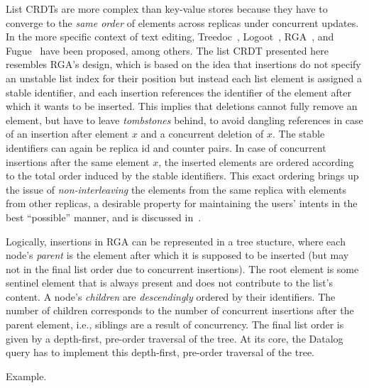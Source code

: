 List \acp{CRDT} are more complex than key-value stores because they have to
converge to the \emph{same order} of elements across replicas under concurrent
updates.
In the more specific context of text editing, Treedoc~\cite{treedoc},
Logoot~\cite{logoot}, RGA~\cite{rga}, and Fugue~\cite{fugue} have been proposed,
among others.
The list \ac{CRDT} presented here resembles RGA's design,
which is based on the idea that insertions do not specify an unstable list index
for their position but instead each list element is assigned a stable identifier,
and each insertion references the identifier of the element after which it wants
to be inserted.
This implies that deletions cannot fully remove an element, but have to leave
\emph{tombstones} behind, to avoid dangling references in case of an
insertion after element \(x\) and a concurrent deletion of \(x\).
The stable identifiers can again be replica id and counter pairs.
In case of concurrent insertions after the same element \(x\),
the inserted elements are ordered according to the total order induced
by the stable identifiers.
This exact ordering brings up the issue of \emph{non-interleaving}
the elements from the same replica with elements from other replicas,
a desirable property for maintaining the users' intents in the best
``possible'' manner, and is discussed in~\cite{fugue}.

Logically, insertions in RGA can be represented in a tree stucture,
where each node's \emph{parent} is the element after which it is supposed to be
inserted (but may not in the final list order due to concurrent insertions).
The root element is some sentinel element that is always present and does not
contribute to the list's content.
A node's \emph{children} are \emph{descendingly} ordered by their identifiers.
The number of children corresponds to the number of concurrent insertions
after the parent element, i.e., siblings are a result of concurrency.
The final list order is given by a depth-first, pre-order traversal of the tree.
At its core, the Datalog query has to implement this depth-first, pre-order
traversal of the tree.

Example.

